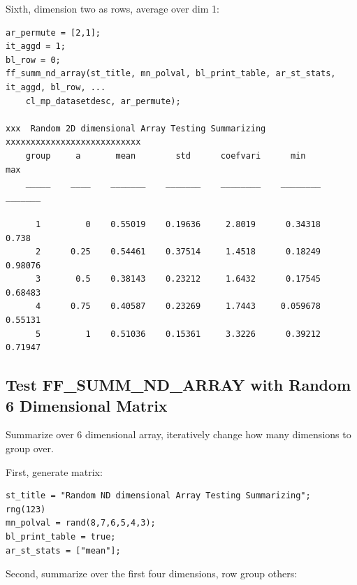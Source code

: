 \documentclass[
]{book}
\begin{document}
Sixth, dimension two as rows, average over dim 1:

\begin{verbatim}
ar_permute = [2,1];
it_aggd = 1; 
bl_row = 0; 
ff_summ_nd_array(st_title, mn_polval, bl_print_table, ar_st_stats, it_aggd, bl_row, ...
    cl_mp_datasetdesc, ar_permute);

xxx  Random 2D dimensional Array Testing Summarizing  xxxxxxxxxxxxxxxxxxxxxxxxxxx
    group     a       mean        std      coefvari      min         max  
    _____    ____    _______    _______    ________    ________    _______

      1         0    0.55019    0.19636     2.8019      0.34318      0.738
      2      0.25    0.54461    0.37514     1.4518      0.18249    0.98076
      3       0.5    0.38143    0.23212     1.6432      0.17545    0.68483
      4      0.75    0.40587    0.23269     1.7443     0.059678    0.55131
      5         1    0.51036    0.15361     3.3226      0.39212    0.71947
\end{verbatim}

\hypertarget{test-ff_summ_nd_array-with-random-6-dimensional-matrix}{%
\subsection{Test FF\_SUMM\_ND\_ARRAY with Random 6 Dimensional Matrix}\label{test-ff_summ_nd_array-with-random-6-dimensional-matrix}}

Summarize over 6 dimensional array, iteratively change how many
dimensions to group over.

First, generate matrix:

\begin{verbatim}
st_title = "Random ND dimensional Array Testing Summarizing";
rng(123)
mn_polval = rand(8,7,6,5,4,3);
bl_print_table = true;
ar_st_stats = ["mean"];
\end{verbatim}

Second, summarize over the first four dimensions, row group others:
\end{document}
